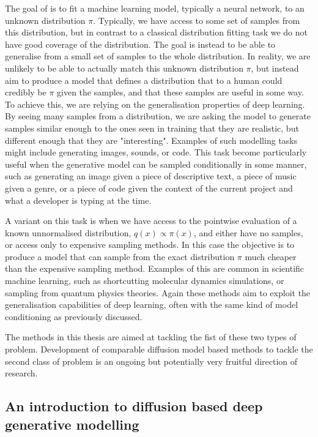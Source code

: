 
The goal of  is to fit a machine learning model, typically a neural network, to an unknown distribution \(\pi\).
Typically, we have access to some set of samples from this distribution, but in contrast to a classical distribution fitting task we do not have good coverage of the distribution.
The goal is instead to be able to generalise from a small set of samples to the whole distribution.
In reality, we are unlikely to be able to actually match this unknown distribution \(\pi\), but instead aim to produce a model that defines a distribution that to a human could credibly be \(\pi\) given the samples, and that these samples are useful in some way.
To achieve this, we are relying on the generalisation properties of deep learning.
By seeing many samples from a distribution, we are asking the model to generate samples similar enough to the ones seen in training that they are realistic, but different enough that they are "interesting".
Examples of such modelling tasks might include generating images, sounds, or code.
This task become particularly useful when the generative model can be sampled conditionally in some manner, such as generating an image given a piece of descriptive text, a piece of music given a genre, or a piece of code given the context of the current project and what a developer is typing at the time.

A variant on this task is when we have access to the pointwise evaluation of a known unnormalised distribution, \(q(x) \propto \pi(x)\), and either have no samples, or access only to expensive sampling methods.
In this case the objective is to produce a model that can sample from the exact distribution \(\pi\) much cheaper than the expensive sampling method.
Examples of this are common in scientific machine learning, such as shortcutting molecular dynamics simulations, or sampling from quantum physics theories.
Again these methods aim to exploit the generalisation capabilities of deep learning, often with the same kind of model conditioning as previously discussed.

The methods in this thesis are aimed at tackling the fist of these two types of problem.
Development of comparable diffusion model based methods to tackle the second class of problem is an ongoing but potentially very fruitful direction of research.

\subsection{An introduction to diffusion based deep generative modelling}

